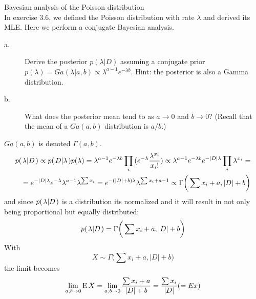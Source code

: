 \documentclass[a4paper,twoside=false,abstract=false,numbers=noenddot,
titlepage=false,headings=small,parskip=half,version=last]{scrartcl}
\begin{document}
\begin{exercise}{3.7} Bayesian analysis of the Poisson distribution \\
    In exercise 3.6, we defined the Poisson distribution with rate $\lambda$
    and derived its MLE. Here we perform a conjugate Bayesian analysis. 
    \begin{description}
        \item[a.] Derive the posterior $p(\lambda|D)$ assuming a conjugate
            prior $p(\lambda)=Ga(\lambda|a,b)\propto
            \lambda^{a-1}e^{-\lambda b}$. Hint: the posterior is also a Gamma
            distribution. 
        \item[b.] What does the posterior mean tend to as $a\rightarrow 0$ and
            $b\rightarrow 0$? (Recall that the mean of a $Ga(a,b)$ distribution
            is $a/b$.)
    \end{description}
\end{exercise}
\begin{solution}
    $Ga(a,b)$ is denoted $\Gamma(a,b)$.
    \begin{equation}
        \begin{split}
            p{(\left. \lambda \middle\vert D \right.)}\propto
            p{(\left. D \middle\vert \lambda \right.)}p(\lambda)=\lambda^{a-1}e^{-\lambda
            b}\prod\limits_i{(e^{-{\lambda}}\frac{{\lambda}^{x_i}}{{x_i}!})}\propto
            \lambda^{a-1}e^{-\lambda
            b}e^{-|D|\lambda}\prod\limits_i{\lambda^{x_i}}= \\
            =e^{-|D|\lambda}e^{-\lambda}\lambda^{a-1}\lambda^{\sum{x_i}}=
            e^{-(|D|+b)\lambda}\lambda^{\sum{x_i}+a-1}\propto
            \Gamma\bigg(\sum{x_i}+a,|D|+b\bigg)
        \end{split}
    \end{equation}
    and since $p{(\left. \lambda \middle\vert D \right.)}$ is a distribution its normalized and it will
    result in not only being proportional but equally distributed:
    \begin{equation}
        p{(\left. \lambda \middle\vert D \right.)}=\Gamma\bigg(\sum{x_i}+a,|D|+b\bigg)
    \end{equation}
    With 
    \begin{equation}
        X \sim \Gamma\bigg(\sum{x_i}+a,|D|+b\bigg)
    \end{equation}
    the limit becomes
    \begin{equation}
        \lim_{a,b\rightarrow 0} {\rm E}\, X = \lim_{a,b\rightarrow 0}\frac{\sum
        x_i+a}{|D|+b}=\frac{\sum x_i}{|D|} (=E x)
    \end{equation}
    
\end{solution}

\end{document}
